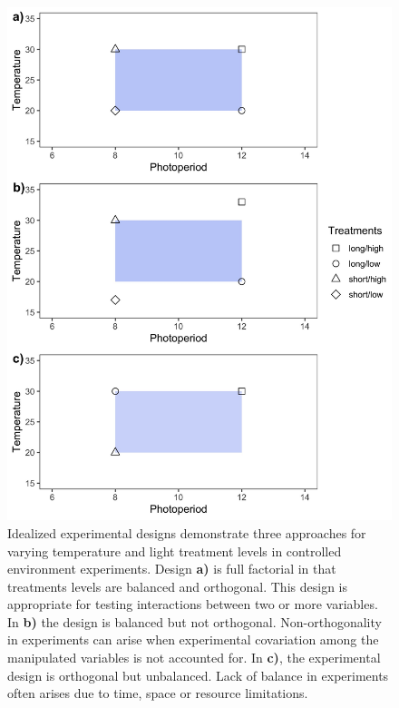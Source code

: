 \documentclass[11pt]{article}
\begin{document}
\begin{figure}[h!]
    \centering
 \includegraphics[width=.8\textwidth]{..//Plots/periodicity_figures/factorial.jpeg}
    \caption{Idealized experimental designs demonstrate three approaches for varying temperature and light treatment levels in controlled environment experiments. Design \textbf{a)} is full factorial in that treatments levels are balanced and orthogonal. This design is appropriate for testing interactions between two or more variables. In \textbf{b)} the design is balanced but not orthogonal. Non-orthogonality in experiments can arise when experimental covariation among the manipulated variables is not accounted for. In \textbf{c)}, the experimental design is orthogonal but unbalanced. Lack of balance in experiments often arises due to time, space or resource limitations. }
    \label{fig:examp}
\end{figure}
\end{document}

